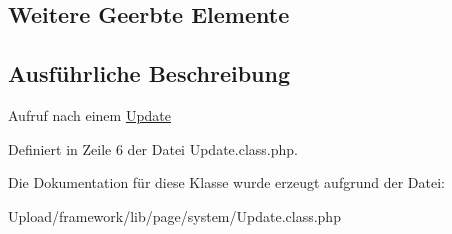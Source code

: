 \subsection*{Weitere Geerbte Elemente}


\subsection{Ausführliche Beschreibung}
Aufruf nach einem \mbox{\hyperlink{class_update}{Update}} 

Definiert in Zeile 6 der Datei Update.\+class.\+php.



Die Dokumentation für diese Klasse wurde erzeugt aufgrund der Datei\+:\begin{DoxyCompactItemize}
\item 
Upload/framework/lib/page/system/Update.\+class.\+php\end{DoxyCompactItemize}
